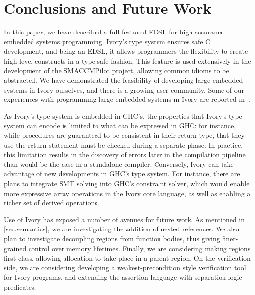 \section{Conclusions and Future Work}
\label{sec:conclusion}

In this paper, we have described a full-featured EDSL for high-assurance
embedded systems programming. Ivory's type system ensures safe C development,
and being an EDSL, it allows programmers the flexibility to create high-level
constructs in a type-safe fashion. This feature is used extensively in the
development of the SMACCMPilot project, allowing common idioms to be abstracted.
We have demonstrated the feasibility of developing large embedded systems in
Ivory ourselves, and there is a growing user community. Some of our experiences
with programming large embedded systems in Ivory are reported in~\cite{smaccm}.

As Ivory's type system is embedded in GHC's, the properties that Ivory's type
system can encode is limited to what can be expressed in GHC: for instance,
while procedures are guaranteed to be consistent in their return type, that they
use the return statement must be checked during a separate phase.  In practice,
this limitation results in the discovery of errors later in the compilation
pipeline than would be the case in a standalone compiler.  Conversely, Ivory can
take advantage of new developments in GHC's type system.  For instance, there
are plans to integrate SMT solving into GHC's constraint solver, which would
enable more expressive array operations in the Ivory core language, as well as
enabling a richer set of derived operations.

Use of Ivory has exposed a number of avenues for future work. As mentioned in
\autoref{sec:semantics}, we are investigating the addition of nested references.
We also plan to investigate decoupling regions from function bodies, thus giving
finer-grained control over memory lifetimes.  Finally, we are considering making
regions first-class, allowing allocation to take place in a parent region.  On
the verification side, we are considering developing a weakest-precondition
style verification tool for Ivory programs, and extending the assertion language
with separation-logic predicates.
